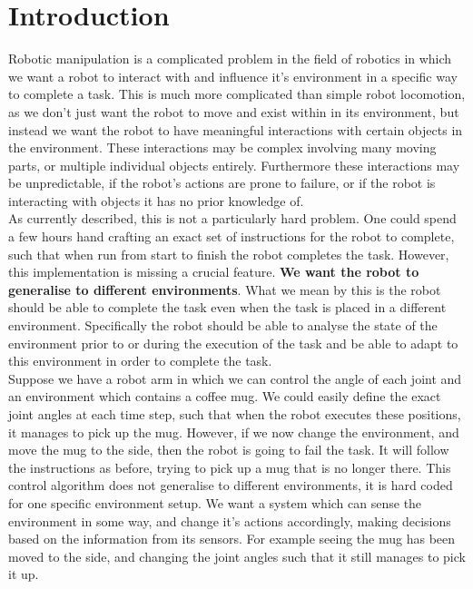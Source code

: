 \chapter{Introduction}
\label{chap:introduction}

Robotic manipulation is a complicated problem in the field of robotics in which we want a robot to interact with and influence it's environment in a specific way to complete a task. This is much more complicated than simple robot locomotion, as we don't just want the robot to move and exist within in its environment, but instead we want the robot to have meaningful interactions with certain objects in the environment. These interactions may be complex involving many moving parts, or multiple individual objects entirely. Furthermore these interactions may be unpredictable, if the robot's actions are prone to failure, or if the robot is interacting with objects it has no prior knowledge of.\\

As currently described, this is not a particularly hard problem. One could spend a few hours hand crafting an exact set of instructions for the robot to complete, such that when run from start to finish the robot completes the task. However, this implementation is missing a crucial feature. \textbf{We want the robot to generalise to different environments}. What we mean by this is the robot should be able to complete the task even when the task is placed in a different environment. Specifically the robot should be able to analyse the state of the environment prior to or during the execution of the task and be able to adapt to this environment in order to complete the task.\\

Suppose we have a robot arm in which we can control the angle of each joint and an environment which contains a coffee mug. We could easily define the exact joint angles at each time step, such that when the robot executes these positions, it manages to pick up the mug. However, if we now change the environment, and move the mug to the side, then the robot is going to fail the task. It will follow the instructions as before, trying to pick up a mug that is no longer there. This control algorithm does not generalise to different environments, it is hard coded for one specific environment setup. We want a system which can sense the environment in some way, and change it's actions accordingly, making decisions based on the information from its sensors. For example seeing the mug has been moved to the side, and changing the joint angles such that it still manages to pick it up.\\

